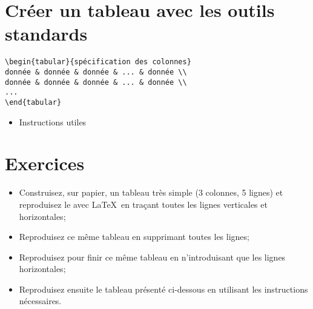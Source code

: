 \section{Créer un tableau avec les outils standards}
\label{tabular}

\vfill

\begin{boxedminipage}{\textwidth}
\begin{verbatim}
\begin{tabular}{spécification des colonnes}
donnée & donnée & donnée & ... & donnée \\
donnée & donnée & donnée & ... & donnée \\
...
\end{tabular}
\end{verbatim}
\end{boxedminipage}

\begin{itemize}
\item Instructions utiles
\end{itemize}

\vfill

\section{Exercices}

\begin{itemize}
\item Construisez, sur papier, un tableau très simple (3 colonnes, 5
  lignes) et reproduisez le avec \LaTeX\ en traçant toutes les lignes
  verticales et horizontales;
\item Reproduisez ce même tableau en supprimant toutes les lignes;
\item Reproduisez pour finir ce même tableau en n'introduisant que les
  lignes horizontales;
\item Reproduisez ensuite le tableau présenté ci-dessous en utilisant
  les instructions nécessaires.
\end{itemize}


